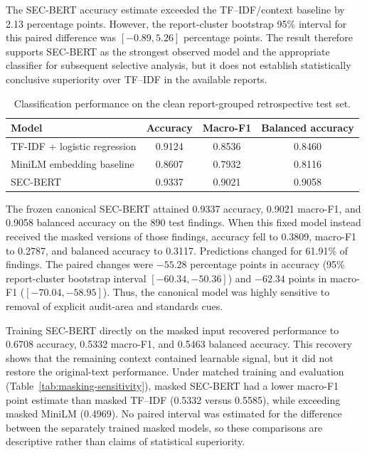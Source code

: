 \documentclass[11pt]{article}
\begin{document}
The SEC-BERT accuracy estimate exceeded the TF--IDF/context baseline by 2.13
percentage points. However, the report-cluster bootstrap 95\% interval for this
paired difference was $[-0.89,5.26]$ percentage points. The result therefore
supports SEC-BERT as the strongest observed model and the appropriate classifier
for subsequent selective analysis, but it does not establish statistically
conclusive superiority over TF--IDF in the available reports.

\begin{table}[t]
  \centering
  \caption{Classification performance on the clean report-grouped retrospective test set.}
  \label{tab:model-comparison}
  \begin{tabular}{lccc}
    \toprule
    Model & Accuracy & Macro-F1 & Balanced accuracy \\
    \midrule
    TF-IDF + logistic regression & 0.9124 & 0.8536 & 0.8460 \\
    MiniLM embedding baseline & 0.8607 & 0.7932 & 0.8116 \\
    SEC-BERT & 0.9337 & 0.9021 & 0.9058 \\
    \bottomrule
  \end{tabular}
\end{table}

The frozen canonical SEC-BERT attained 0.9337 accuracy, 0.9021 macro-F1, and
0.9058 balanced accuracy on the 890 test findings. When this fixed model instead
received the masked versions of those findings, accuracy fell to 0.3809,
macro-F1 to 0.2787, and balanced accuracy to 0.3117. Predictions changed for
61.91\% of findings. The paired changes were $-55.28$ percentage points in
accuracy (95\% report-cluster bootstrap interval $[-60.34,-50.36]$) and $-62.34$
points in macro-F1 ($[-70.04,-58.95]$). Thus, the canonical model was highly
sensitive to removal of
explicit audit-area and standards cues.

Training SEC-BERT directly on the masked input recovered performance to 0.6708
accuracy, 0.5332 macro-F1, and 0.5463 balanced accuracy. This recovery shows that
the remaining context contained learnable signal, but it did not restore the
original-text performance. Under matched training and evaluation
(Table~\ref{tab:masking-sensitivity}), masked SEC-BERT had a lower macro-F1 point
estimate than masked TF--IDF (0.5332 versus 0.5585), while exceeding masked
MiniLM (0.4969). No paired interval was estimated for the difference between the
separately trained masked models, so these comparisons are descriptive rather
than claims of statistical superiority.
\end{document}

